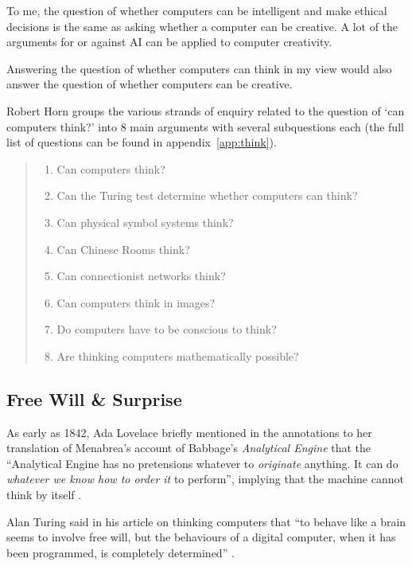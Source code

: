 To me, the question of whether computers can be intelligent and make ethical decisions is the same as asking whether a computer can be creative. A lot of the arguments for or against \ac{AI} can be applied to computer creativity.  

Answering the question of whether computers can think in my view would also answer the question of whether computers can be creative.
 
Robert Horn groups the various strands of enquiry related to the question of `can computers think?' into 8 main arguments with several subquestions each \autocite*{Horn2009} (the full list of questions can be found in appendix~\ref{app:think}). 

\begin{quotation}
  \begin{enumerate}
    \item Can computers think?
    \item Can the Turing test determine whether computers can think?
    \item Can physical symbol systems think?
    \item Can Chinese Rooms think?
    \item Can connectionist networks think?
    \item Can computers think in images?
    \item Do computers have to be conscious to think?
    \item Are thinking computers mathematically possible?
  \end{enumerate}
\end{quotation}


\subsection{Free Will \& Surprise}

As early as 1842, Ada Lovelace briefly mentioned in the annotations to her translation of Menabrea's account of Babbage's \textit{Analytical Engine} that the ``Analytical Engine has no pretensions whatever to \textit{originate} anything. It can do \textit{whatever we know how to order it} to perform'', implying that the machine cannot think by itself \autocite[her emphasis]{Menabrea1842}.

Alan Turing said in his article on thinking computers that ``to behave like a brain seems to involve free will, but the behaviours of a digital computer, when it has been programmed, is completely determined'' \autocite*{Turing1951}. 

